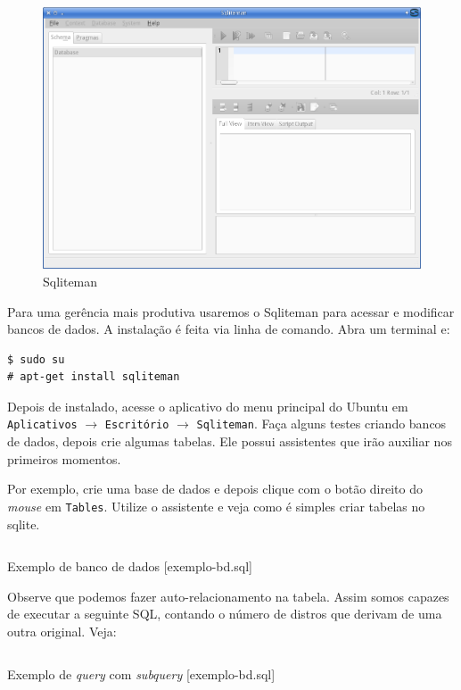 \begin{figure}[h]
\centering
\includegraphics[scale=0.4]{img/preparando-ambiente/sqliteman.png}
\caption{Sqliteman}
\end{figure}

Para uma gerência mais produtiva usaremos o Sqliteman para acessar e
modificar bancos de dados. A instalação é feita via linha de comando.
Abra um terminal e:

\begin{verbatim}
$ sudo su
# apt-get install sqliteman
\end{verbatim}
Depois de instalado, acesse o aplicativo do menu principal do Ubuntu em
\texttt{Aplicativos} $\rightarrow$ \texttt{Escritório} $\rightarrow$
\texttt{Sqliteman}. Faça alguns testes criando bancos de dados, depois
crie algumas tabelas. Ele possui assistentes que irão auxiliar nos
primeiros momentos.

Por exemplo, crie uma base de dados e depois clique com o botão direito
do \emph{mouse} em \texttt{Tables}. Utilize o assistente e veja como é
simples criar tabelas no sqlite.

\begin{listing}[H]
  \inputminted[linenos=true,frame=bottomline,tabsize=3]{ sql }{ source/exemplo-bd-1.sql }
  \caption{Exemplo de banco de dados [exemplo-bd.sql]}
\end{listing}

Observe que podemos fazer auto-relacionamento na tabela. Assim somos
capazes de executar a seguinte SQL, contando o número de distros que
derivam de uma outra original. Veja:

\begin{listing}[H]
  \inputminted[linenos=true,frame=bottomline,tabsize=3]{ sql }{ source/exemplo-bd-2.sql }
  \caption{Exemplo de \textit{query} com \textit{subquery} [exemplo-bd.sql]}
\end{listing}

